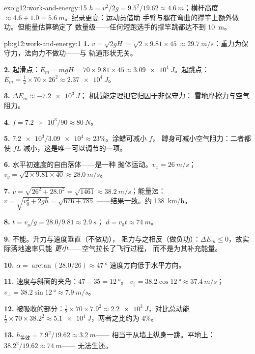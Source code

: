 \begin{solution}{exo:g12:work-and-energy:15}
$h = v^2/2g = 9.5^2/19.62 \approx \qty{4.6}{m}$；横杆高度 $\approx
4.6 + 1.0 = \qty{5.6}{m}$。纪录更高：运动员借助
手臂与腿在弯曲的撑竿上额外做功。但能量估算确定了
数量级——任何短跑选手的撑竿跳都达不到 \qty{10}{m}。
\end{solution}

\begin{solution}{pb:g12:work-and-energy:1}
\textbf{1.} $v = \sqrt{2gH} = \sqrt{2 \times 9.81 \times 45} \approx
\qty{29.7}{m/s}$：重力为保守力，法向力不做功——与
轨道形状无关。

\textbf{2.} 起滑点：$E_m = mgH = 70 \times 9.81 \times 45 \approx
\qty{3.09e4}{J}$。起跳点：$E_m = \tfrac12 \times 70 \times 26^2
\approx \qty{2.37e4}{J}$。

\textbf{3.} $\Delta E_m \approx \qty{-7.2e3}{J}$；
机械能定理把它归因于非保守力：
雪地摩擦力与空气阻力。

\textbf{4.} $f = \num{7.2e3}/90 \approx \qty{80}{N}$。

\textbf{5.} $\num{7.2e3}/\num{3.09e4} \approx 23\%$。涂蜡可减小 $f$，
蹲身可减小空气阻力：二者都使 $fL$ 减小，这是唯一可以调节的一项。

\textbf{6.} 水平初速度的自由落体——是一种
抛体运动。$v_x = \qty{26}{m/s}$；
$v_y = \sqrt{2 \times 9.81 \times 40} \approx \qty{28.0}{m/s}$。

\textbf{7.} $v = \sqrt{26^2 + 28.0^2} = \sqrt{1461} \approx
\qty{38.2}{m/s}$；能量法：$v = \sqrt{v_0^2 + 2gh} = \sqrt{676 + 785}$
——结果一致。约 \qty{138}{km/h}。

\textbf{8.} $t = v_y/g = 28.0/9.81 \approx \qty{2.9}{s}$；
$d = v_0 t \approx \qty{74}{m}$。

\textbf{9.} 不能。升力与速度垂直（不做功），
阻力与之相反（做负功）：$\Delta E_m \leq 0$，故实际落地速率只能
\emph{更小}——空气拉长了飞行过程，
而不是为其补充能量。

\textbf{10.} $\alpha = \arctan(28.0/26) \approx \qty{47}{\degree}$
速度方向低于水平方向。

\textbf{11.} 速度与斜面的夹角：$47 - 35 = \qty{12}{\degree}$。
$v_\parallel = 38.2\cos\qty{12}{\degree} \approx \qty{37.4}{m/s}$；
$v_\perp = 38.2\sin\qty{12}{\degree} \approx \qty{7.9}{m/s}$。

\textbf{12.} 被吸收的部分：$\tfrac12 \times 70 \times 7.9^2 \approx
\qty{2.2e3}{J}$，对比总动能 $\tfrac12 \times 70 \times 38.2^2 \approx
\qty{5.1e4}{J}$，两者之比约为 $4\%$。

\textbf{13.} $h_{\text{等效}} = 7.9^2/19.62 \approx \qty{3.2}{m}$——
相当于从墙上纵身一跳。平地上：$38.2^2/19.62 \approx \qty{74}{m}$——
无法生还。


\end{solution}
